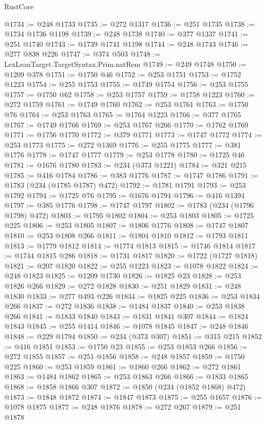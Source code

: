 \begin{lexlean}{RustCore}
\begin{coremodule}
@1734 := @248 @1733
@1735 := @272 @1317
@1736 := @251 @1735
@1738 := @1734 @1736 @1198
@1739 := @248 @1738
@1740 := @377 @1337
@1741 := @251 @1740
@1743 := @1739 @1741 @1198
@1744 := @248 @1743
@1746 := @277 @838 @226
@1747 := @374 @503
@1748 := LexLeanTarget.TargetSyntax.Prim.natRem
@1749 := @249 @1748
@1750 := @1209 @378
@1751 := @1750 @46
@1752 := @253 @1751
@1753 := @1752 @1223
@1754 := @255 @1753
@1755 := @1749 @1754
@1756 := @253 @1755
@1757 := @1750 @62
@1758 := @253 @1757
@1759 := @1758 @1223
@1760 := @272 @1759
@1761 := @1749 @1760
@1762 := @253 @1761
@1763 := @1750 @76
@1764 := @253 @1763
@1765 := @1764 @1223
@1766 := @377 @1765
@1767 := @1749 @1766
@1769 := @253 @1767 @266
@1770 := @1762 @1769
@1771 := @1756 @1770
@1772 := @379 @1771
@1773 := @1747 @1772
@1774 := @253 @1773
@1775 := @272 @1369
@1776 := @255 @1775
@1777 := @381 @1776
@1778 := @1747 @1777
@1779 := @253 @1778
@1780 := @1725 @46
@1781 := @1676 @1780
@1783 := @234 (@373 @1221)
@1784 := @321 @215
@1785 := @416 @1784
@1786 := @383 @1776
@1787 := @1747 @1786
@1791 := @1783 (@234 (@1785 @1787) @472)
@1792 := @1781 @1791
@1793 := @253 @1792
@1794 := @1725 @76
@1795 := @1676 @1794
@1796 := @416 @1394
@1797 := @385 @1776
@1798 := @1747 @1797
@1802 := @1783 (@234 (@1796 @1798) @472)
@1803 := @1795 @1802
@1804 := @253 @1803
@1805 := @1725 @225
@1806 := @253 @1805
@1807 := @1806 @1776
@1808 := @1747 @1807
@1810 := @253 @1808 @266
@1811 := @1804 @1810
@1812 := @1793 @1811
@1813 := @1779 @1812
@1814 := @1774 @1813
@1815 := @1746 @1814
@1817 := @1744 @1815 @286
@1818 := @1731 @1817
@1820 := @1722 (@1727 @1818)
@1821 := @207 @1820
@1822 := @255 @1223
@1823 := @1078 @1822
@1824 := @248 @1823
@1825 := @1209 @1730
@1826 := @1825 @23
@1828 := @253 @1826 @266
@1829 := @272 @1828
@1830 := @251 @1829
@1831 := @248 @1830
@1833 := @277 @493 @226
@1834 := @1825 @225
@1836 := @253 @1834 @266
@1837 := @272 @1836
@1838 := @1484 @1837
@1840 := @253 @1838 @266
@1841 := @1833 @1840
@1843 := @1831 @1841 @307
@1844 := @1824 @1843
@1845 := @255 @1414
@1846 := @1078 @1845
@1847 := @248 @1846
@1848 := @229 @1794
@1850 := @234 (@373 @307)
@1851 := @315 @215
@1852 := @416 @1851
@1853 := @1750 @23
@1855 := @253 @1853 @266
@1856 := @272 @1855
@1857 := @251 @1856
@1858 := @248 @1857
@1859 := @1750 @225
@1860 := @253 @1859
@1861 := @1860 @266
@1862 := @272 @1861
@1863 := @1484 @1862
@1865 := @253 @1863 @266
@1866 := @1833 @1865
@1868 := @1858 @1866 @307
@1872 := @1850 (@234 (@1852 @1868) @472)
@1873 := @1848 @1872
@1874 := @1847 @1873
@1875 := @255 @1657
@1876 := @1078 @1875
@1877 := @248 @1876
@1878 := @272 @267
@1879 := @251 @1878

\end{coremodule}
\end{lexlean}
